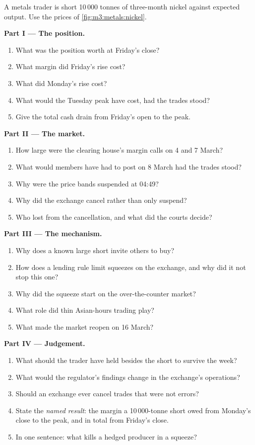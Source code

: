 \begin{problem}\label{pb:m3:metals:1}
A metals trader is short 10\,000 tonnes of three-month nickel against expected output. Use the
prices of \cref{fig:m3:metals:nickel}.

\medskip\noindent\textbf{Part I --- The position.}
\begin{enumerate}
\item What was the position worth at Friday's close?
\item What margin did Friday's rise cost?
\item What did Monday's rise cost?
\item What would the Tuesday peak have cost, had the trades stood?
\item Give the total cash drain from Friday's open to the peak.
\end{enumerate}

\medskip\noindent\textbf{Part II --- The market.}
\begin{enumerate}[resume]
\item How large were the clearing house's margin calls on 4 and 7 March?
\item What would members have had to post on 8 March had the trades stood?
\item Why were the price bands suspended at 04:49?
\item Why did the exchange cancel rather than only suspend?
\item Who lost from the cancellation, and what did the courts decide?
\end{enumerate}

\medskip\noindent\textbf{Part III --- The mechanism.}
\begin{enumerate}[resume]
\item Why does a known large short invite others to buy?
\item How does a lending rule limit squeezes on the exchange, and why did it not stop this one?
\item Why did the squeeze start on the over-the-counter market?
\item What role did thin Asian-hours trading play?
\item What made the market reopen on 16 March?
\end{enumerate}

\medskip\noindent\textbf{Part IV --- Judgement.}
\begin{enumerate}[resume]
\item What should the trader have held besides the short to survive the week?
\item What would the regulator's findings change in the exchange's operations?
\item Should an exchange ever cancel trades that were not errors?
\item State the \emph{named result}: the margin a 10\,000-tonne short owed from Monday's close to
the peak, and in total from Friday's close.
\item In one sentence: what kills a hedged producer in a squeeze?
\end{enumerate}
\end{problem}

